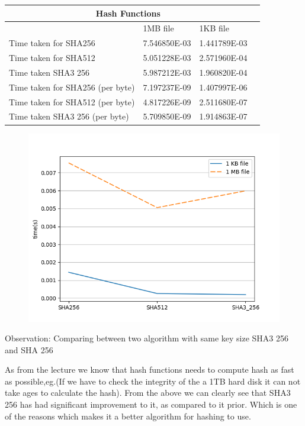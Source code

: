 \documentclass[12pt]{article}%
\begin{document}
\begin{tabular}{ |p{8cm}|p{3cm}|p{3cm}|p{3cm} }
 \hline
 \multicolumn{3}{|c|}{Hash Functions} \\
 \hline
	 & 1MB file & 1KB file\\
 \hline
 Time taken for SHA256   &   7.546850E-03   & 1.441789E-03  \\
  \hline
 Time taken for SHA512 &  5.051228E-03  & 2.571960E-04	\\
 \hline
 Time taken SHA3 256   &  5.987212E-03    & 1.960820E-04  \\
  \hline
 Time taken for SHA256 (per byte)   & 7.197237E-09     & 1.407997E-06  \\
  \hline
 Time taken for SHA512 (per byte) &4.817226E-09    &2.511680E-07 	\\
 \hline
 Time taken SHA3 256 (per byte)  &5.709850E-09      & 1.914863E-07  \\
  \hline
\end{tabular}
\begin{figure}[h]
    \centering
	\includegraphics[scale=0.5]{q1d}
\end{figure}

Observation:
Comparing between two algorithm with same key size SHA3 256 and SHA 256

As from the lecture we know that hash functions needs to compute hash as fast as possible,eg.(If we have to check the integrity of the a 1TB hard disk it can not take ages to calculate the hash). From the above we can clearly see that SHA3 256 has had significant improvement to it, as compared to it prior. Which is one of the reasons which makes it a better algorithm for hashing to use.
 
\end{document}
